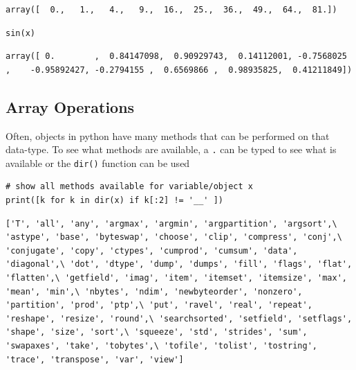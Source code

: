 \documentclass[%
oneside,                 %
final,                   %
10pt]{article}
\begin{document}
\begin{verbatim}
array([  0.,   1.,   4.,   9.,  16.,  25.,  36.,  49.,  64.,  81.])
\end{verbatim}


\begin{verbatim}
sin(x)
\end{verbatim}

\begin{verbatim}
array([ 0.        ,  0.84147098,  0.90929743,  0.14112001, -0.7568025 ,    -0.95892427, -0.2794155 ,  0.6569866 ,  0.98935825,  0.41211849])
\end{verbatim}


\subsection{Array Operations}

Often, objects in python have many methods that can be performed on that data-type. To see what methods are available, a \texttt{.} can be typed to see what is available or the \texttt{dir()} function can be used

\begin{verbatim}
# show all methods available for variable/object x
print([k for k in dir(x) if k[:2] != '__' ])
\end{verbatim}

\begin{verbatim}
['T', 'all', 'any', 'argmax', 'argmin', 'argpartition', 'argsort',\ 'astype', 'base', 'byteswap', 'choose', 'clip', 'compress', 'conj',\ 'conjugate', 'copy', 'ctypes', 'cumprod', 'cumsum', 'data', 'diagonal',\ 'dot', 'dtype', 'dump', 'dumps', 'fill', 'flags', 'flat', 'flatten',\ 'getfield', 'imag', 'item', 'itemset', 'itemsize', 'max', 'mean', 'min',\ 'nbytes', 'ndim', 'newbyteorder', 'nonzero', 'partition', 'prod', 'ptp',\ 'put', 'ravel', 'real', 'repeat', 'reshape', 'resize', 'round',\ 'searchsorted', 'setfield', 'setflags', 'shape', 'size', 'sort',\ 'squeeze', 'std', 'strides', 'sum', 'swapaxes', 'take', 'tobytes',\ 'tofile', 'tolist', 'tostring', 'trace', 'transpose', 'var', 'view']
\end{verbatim}
\end{document}
